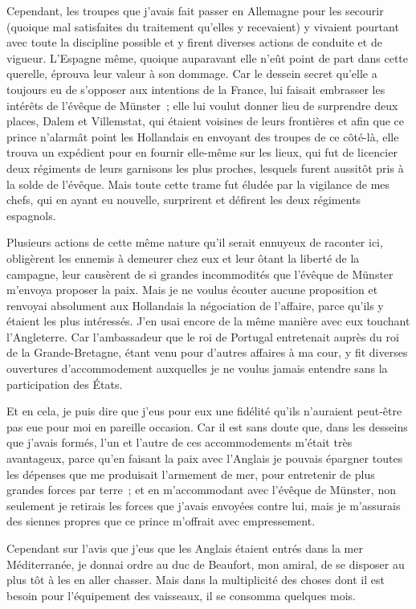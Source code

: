 \documentclass[french,twoside]{book} %
\begin{document}
Cependant, les troupes que j’avais fait passer en Allemagne pour les secourir (quoique mal satisfaites du traitement qu’elles y recevaient) y vivaient pourtant avec toute la discipline possible et y firent diverses actions de conduite et de vigueur. L’Espagne même, quoique auparavant elle n’eût point de part dans cette querelle, éprouva leur valeur à son dommage. Car le dessein secret qu’elle a toujours eu de s’opposer aux intentions de la France, lui faisait embrasser les intérêts de l’évêque de Münster ; elle lui voulut donner lieu de surprendre deux places, Dalem et Villemstat, qui étaient voisines de leurs frontières et afin que ce prince n’alarmât point les Hollandais en envoyant des troupes de ce côté-là, elle trouva un expédient pour en fournir elle-même sur les lieux, qui fut de licencier deux régiments de leurs garnisons les plus proches, lesquels furent aussitôt pris à la solde de l’évêque. Mais toute cette trame fut éludée par la vigilance de mes chefs, qui en ayant eu nouvelle, surprirent et défirent les deux régiments espagnols.\par
Plusieurs actions de cette même nature qu’il serait ennuyeux de raconter ici, obligèrent les ennemis à demeurer chez eux et leur ôtant la liberté de la campagne, leur causèrent de si grandes incommodités que l’évêque de Münster m’envoya proposer la paix. Mais je ne voulus écouter aucune proposition et renvoyai absolument aux Hollandais la négociation de l’affaire, parce qu’ils y étaient les plus intéressés. J’en usai encore de la même manière avec eux touchant l’Angleterre. Car l’ambassadeur que le roi de Portugal entretenait auprès du roi de la Grande-Bretagne, étant venu pour d’autres affaires à ma cour, y fit diverses ouvertures d’accommodement auxquelles je ne voulus jamais entendre sans la participation des États.\par
Et en cela, je puis dire que j’eus pour eux une fidélité qu’ils n’auraient peut-être pas eue pour moi en pareille occasion. Car il est sans doute que, dans les desseins que j’avais formés, l’un et l’autre de ces accommodements m’était très avantageux, parce qu’en faisant la paix avec l’Anglais je pouvais épargner toutes les dépenses que me produisait l’armement de mer, pour entretenir de plus grandes forces par terre ; et en m’accommodant avec l’évêque de Münster, non seulement je retirais les forces que j’avais envoyées contre lui, mais je m’assurais des siennes propres que ce prince m’offrait avec empressement.\par
Cependant sur l’avis que j’eus que les Anglais étaient entrés dans la mer Méditerranée, je donnai ordre au duc de Beaufort, mon amiral, de se disposer au plus tôt à les en aller chasser. Mais dans la multiplicité des choses dont il est besoin pour l’équipement des vaisseaux, il se consomma quelques mois.\par
\end{document}
